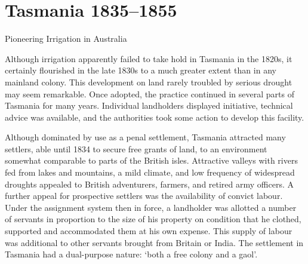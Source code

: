 
\setcounter{endnote}{0}
\chapter{Tasmania 1835--1855}
\label{ch:tas}
%
{Pioneering Irrigation in Australia}

Although irrigation apparently failed to take hold in Tasmania in the
1820s, it certainly flourished in the late 1830s to a much greater
extent than in any mainland colony.  This development on land rarely
troubled by serious drought may seem remarkable.  Once adopted, the
practice continued in several parts of Tasmania for many years.
Individual landholders displayed initiative, technical advice was
available, and the authorities took some action to develop this
facility.

Although dominated by use as a penal settlement, Tasmania attracted
many settlers, able until 1834 to secure free grants of land, to an
environment somewhat comparable to parts of the British isles.
Attractive valleys with rivers fed from lakes and mountains, a mild
climate, and low frequency of widespread droughts appealed to British
adventurers, farmers, and retired army officers.  A further appeal for
prospective settlers was the availability of convict labour.  Under
the assignment system then in force, a landholder was allotted a
number of servants in proportion to the size of his property on
condition that he clothed, supported and accommodated them at his own
expense.  This supply of labour was additional to other servants
brought from Britain or India. The settlement in Tasmania had a
dual-purpose nature: `both a free colony and a
gaol'.

